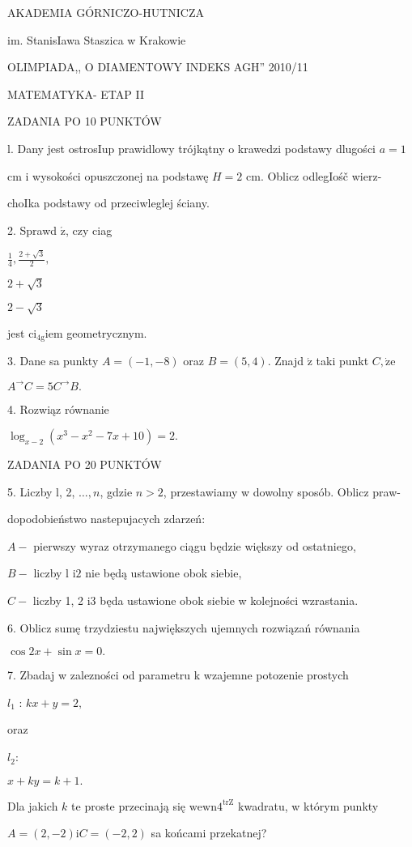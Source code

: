 \documentclass[a4paper,12pt]{article}
\begin{document}
AKADEMIA GÓRNICZO-HUTNICZA

im. StanisIawa Staszica w Krakowie

OLIMPIADA,, O DIAMENTOWY INDEKS AGH'' 2010/11

MATEMATYKA- ETAP II

ZADANIA PO 10 PUNKTÓW

l. Dany jest ostrosIup prawidlowy trójkątny o krawedzi podstawy dlugości $a=1$

cm i wysokości opuszczonej na podstawę $H=2$ cm. Oblicz odlegIośč wierz-

choIka podstawy od przeciwleglej ściany.

2. Sprawd $\acute{\mathrm{z}}$, czy ciag

$\displaystyle \frac{1}{4}, \displaystyle \frac{2+\sqrt{3}}{2},$

$2+\sqrt{3}$

$2-\sqrt{3}$

jest $\mathrm{c}\mathrm{i}_{4\mathrm{g}}\mathrm{i}\mathrm{e}\mathrm{m}$ geometrycznym.

3. Dane sa punkty $A=(-1,-8)$ oraz $B=(5,4).$ Znajd $\acute{\mathrm{z}}$ taki punkt $C, \dot{\mathrm{z}}\mathrm{e}$

$A^{\rightarrow}C=5C^{\rightarrow}B.$

4. Rozwiąz równanie

$\log_{x-2}(x^{3}-x^{2}-7x+10)=2.$

ZADANIA PO 20 PUNKTÓW

5. Liczby l, 2, $\ldots, n$, gdzie $n>2$, przestawiamy w dowolny sposób. Oblicz praw-

dopodobieństwo nastepujacych zdarzeń:

$A-$ pierwszy wyraz otrzymanego ciągu będzie większy od ostatniego,

$B-$ liczby l $\mathrm{i}2$ nie będą ustawione obok siebie,

$C-$ liczby 1, 2 $\mathrm{i}3$ będa ustawione obok siebie w kolejności wzrastania.

6. Oblicz sumę trzydziestu największych ujemnych rozwiązań równania

$\cos 2x+\sin x=0.$

7. Zbadaj w zalezności od parametru k wzajemne potozenie prostych

$l_{1}$ : $kx+y=2,$

oraz

$l_{2}$:

$x+ky=k+1.$

Dla jakich $k$ te proste przecinają się $\mathrm{w}\mathrm{e}\mathrm{w}\mathrm{n}4^{\mathrm{t}\mathrm{r}\mathrm{Z}}$ kwadratu, w którym punkty

$A=(2,-2)\mathrm{i}C=(-2,2)$ sa końcami przekatnej?
\end{document}
